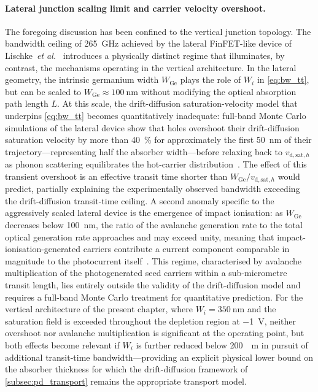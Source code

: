 \paragraph{Lateral junction scaling limit and carrier velocity overshoot.}
The foregoing discussion has been confined to the vertical junction topology.
The bandwidth ceiling of \SI{265}{\giga\hertz} achieved by the lateral
FinFET-like device of Lischke~\textit{et al.}~\cite{Lischke2021} introduces
a physically distinct regime that illuminates, by contrast, the mechanisms
operating in the vertical architecture. In the lateral geometry, the intrinsic
germanium width $W_{\mathrm{Ge}}$ plays the role of $W_i$ in \cref{eq:bw_tt},
but can be scaled to $W_{\mathrm{Ge}} \approx \SI{100}{\nano\metre}$ without
modifying the optical absorption path length $L$. At this scale, the
drift-diffusion saturation-velocity model that underpins \cref{eq:bw_tt}
becomes quantitatively inadequate: full-band Monte Carlo simulations of the
lateral device show that holes overshoot their drift-diffusion saturation
velocity by more than \SI{40}{\percent} for approximately the first
\SI{50}{\nano\metre} of their trajectory—representing half the absorber
width—before relaxing back to $v_{\mathrm{d,sat},h}$ as phonon scattering
equilibrates the hot-carrier distribution~\cite{Alasio2024}. The effect of
this transient overshoot is an effective transit time shorter than
$W_{\mathrm{Ge}}/v_{\mathrm{d,sat},h}$ would predict, partially explaining
the experimentally observed bandwidth exceeding the drift-diffusion transit-time
ceiling. A second anomaly specific to the aggressively scaled lateral device
is the emergence of impact ionisation: as $W_{\mathrm{Ge}}$ decreases below
\SI{100}{\nano\metre}, the ratio of the avalanche generation rate to the total
optical generation rate approaches and may exceed unity, meaning that
impact-ionisation-generated carriers contribute a current component comparable
in magnitude to the photocurrent itself~\cite{Alasio2024}. This regime,
characterised by avalanche multiplication of the photogenerated seed carriers
within a sub-micrometre transit length, lies entirely outside the validity of
the drift-diffusion model and requires a full-band Monte Carlo treatment for
quantitative prediction. For the vertical architecture of the present chapter,
where $W_i = \SI{350}{\nano\metre}$ and the saturation field is exceeded
throughout the depletion region at \SI{-1}{\volt}, neither overshoot nor
avalanche multiplication is significant at the operating point, but both
effects become relevant if $W_i$ is further reduced below \SI{200}{\nano
\metre} in pursuit of additional transit-time bandwidth—providing an explicit
physical lower bound on the absorber thickness for which the drift-diffusion
framework of \cref{subsec:pd_transport} remains the appropriate transport model.


